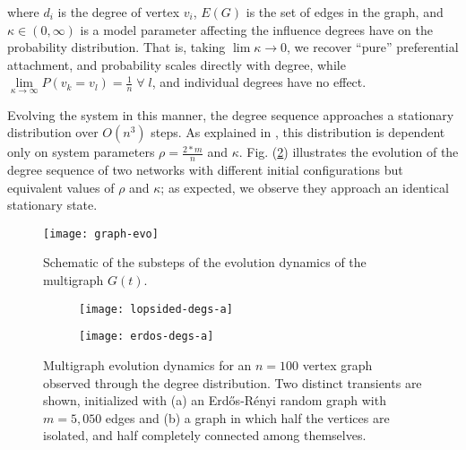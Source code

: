 \documentclass[epjST, final]{svjour}
\begin{document}
\begin{onehalfspace}
\noindent where $d_i$ is the degree of vertex $v_i$, $E(G)$ is the set of edges in the graph, and $\kappa \in (0, \infty)$ is a model parameter affecting the influence degrees have on the probability distribution. That is, taking $\lim\limits{\kappa \rightarrow 0}$, we recover ``pure'' preferential attachment, and probability scales directly with degree, while $\lim\limits_{\kappa \rightarrow \infty} P(v_k = v_l) = \frac{1}{n} \; \forall \; l$, and individual degrees have no effect. \par

Evolving the system in this manner, the degree sequence approaches a
stationary distribution over $O(n^3)$ steps. As explained in
\cite{rath_time_2012}, this distribution is dependent only on system
parameters $\rho = \frac{2*m}{n}$ and $\kappa$. Fig. (\ref{fig:dse})
illustrates the evolution of the degree sequence of two networks with
different initial configurations but equivalent values of $\rho$ and
$\kappa$; as expected, we observe they approach an identical stationary state.

\begin{figure}[ht!]
  \centering
  \texttt{[image: graph-evo]}
  \caption{Schematic of the substeps of the evolution dynamics of the
    multigraph $G(t)$. \label{fig:step-illustration}}
\end{figure}

\begin{figure}[th!]
  \vspace{-5mm}
  \centering
  \begin{subfigure}[t]{0.49\textwidth}
    \centering
    \texttt{[image: lopsided-degs-a]}
    \subcaption{\label{fig:lopsided-init}}
  \end{subfigure} %
  \begin{subfigure}[t]{0.49\textwidth}
    \centering
    \texttt{[image: erdos-degs-a]}
    \subcaption{\label{fig:erdos-init}}
  \end{subfigure}
  \caption{Multigraph evolution dynamics for an $n=100$ vertex graph
    observed through the degree distribution. Two distinct transients
    are shown, initialized with (a) an Erd\H{o}s-R\'{e}nyi random
    graph with $m = 5,050$ edges and (b) a graph in which half the
    vertices are isolated, and half completely connected among
    themselves. \label{fig:dse}}
\end{figure}


\end{onehalfspace}
\end{document}

